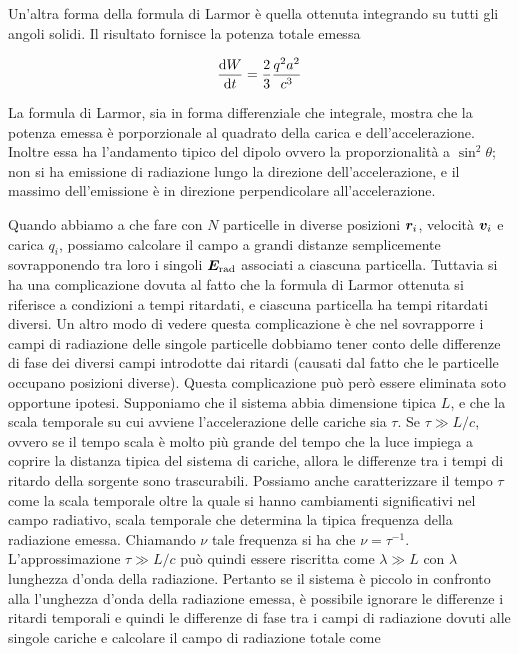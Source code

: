 Un'altra forma della formula di Larmor è quella ottenuta integrando su tutti gli angoli solidi. Il risultato fornisce la potenza totale emessa
\begin{EQ}
\begin{equation}
\dfrac{\mathrm{d} {W}}{\mathrm{d} {t}} = \dfrac{2}{3} \dfrac{q^2 a^2}{c^3} \label{eq:Larmor3}
\end{equation}
\end{EQ}
La formula di Larmor, sia in forma differenziale che integrale, mostra che la potenza emessa è porporzionale al quadrato della carica e dell'accelerazione. Inoltre essa ha l'andamento tipico del dipolo ovvero la proporzionalità a $\sin^2 \theta$; non si ha emissione di radiazione lungo la direzione dell'accelerazione, e il massimo dell'emissione è in direzione perpendicolare all'accelerazione. 

Quando abbiamo a che fare con $N$ particelle in diverse posizioni $\V{r}_i$, velocità $\V{v}_i$ e carica $q_i$, possiamo calcolare il campo a grandi distanze semplicemente sovrapponendo tra loro i singoli $\V{E}_\mathrm{rad}$ associati a ciascuna particella. Tuttavia si ha una complicazione dovuta al fatto che la formula di Larmor ottenuta si riferisce a condizioni a tempi ritardati, e ciascuna particella ha tempi ritardati diversi. Un altro modo di vedere questa complicazione è che nel sovrapporre i campi di radiazione delle singole particelle dobbiamo tener conto delle differenze di fase dei diversi campi introdotte dai ritardi (causati dal fatto che le particelle occupano posizioni diverse). Questa complicazione può però essere eliminata soto opportune ipotesi. Supponiamo che il sistema abbia dimensione tipica $L$, e che la scala temporale su cui avviene l'accelerazione delle cariche sia $\tau$. Se $\tau\gg L/c$, ovvero se il tempo scala è molto più grande del tempo che la luce impiega a coprire la distanza tipica del sistema di cariche, allora le differenze tra i tempi di ritardo della sorgente sono trascurabili. Possiamo anche caratterizzare il tempo $\tau$ come la scala temporale oltre la quale si hanno cambiamenti significativi nel campo radiativo, scala temporale che determina la tipica frequenza della radiazione emessa. Chiamando $\nu$ tale frequenza si ha che $\nu = \tau^{-1}$. L'approssimazione $\tau\gg L/c$ può quindi essere riscritta come $\lambda\gg L$ con $\lambda$ lunghezza d'onda della radiazione. Pertanto se il sistema è piccolo in confronto alla l'unghezza d'onda della radiazione emessa, è possibile ignorare le differenze i ritardi temporali e quindi le differenze di fase tra i campi di radiazione dovuti alle singole cariche e calcolare il campo di radiazione totale come
